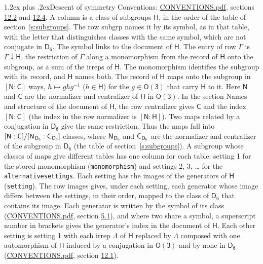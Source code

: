 \documentclass[10pt,a4paper]{article}
\makeatletter
\renewcommand\section{\@startsection{section}{1}{\z@}{-3ex plus -1ex minus -.2ex}%
  {1.2ex plus .2ex}{\normalfont\large\sffamily\bfseries\color{parttitle}}}
\numberwithin{equation}{section}
\newcommand{\grp}[1]{\mathsf{#1}}
\newcommand{\grpindex}[2]{[#1 : #2]}
\newcommand{\restr}[2]{#1\!\downarrow#2}
\newcommand{\hairsp}{\mkern1mu}
\makeatother
\begin{document}
\section{Descent of symmetry}\label{s:subduction}
Conventions: \href{../../CONVENTIONS.pdf}{CONVENTIONS.pdf}, sections \href{../../CONVENTIONS.pdf\#conv.12.2}{12.2} and \href{../../CONVENTIONS.pdf\#conv.12.4}{12.4}.
A column is a class of subgroups $\grp{H}$, in the order of the table of section~\ref{s:subgroups}. The row subgrp names it by its symbol, as in that table, with the letter that distinguishes classes with the same symbol, which are not conjugate in $\grp{D_{6}}$. The symbol links to the document of $\grp{H}$. The entry of row $\Gamma$ is $\restr{\Gamma}{\grp{H}}$, the restriction of $\Gamma$ along a monomorphism from the record of $\grp{H}$ onto the subgroup, as a sum of the irreps of $\grp{H}$. The monomorphism identifies the subgroup with its record, and $\grp{H}$ names both. \label{n:group.normalizer.o3}\label{n:group.centralizer.o3}The record of $\grp{H}$ maps onto the subgroup in $\grpindex{\grp{N}}{\grp{C}}$ ways, $h \mapsto g h g^{-1}$ ($h \in \grp{H}$) for the $g \in \grp{O(3)}$ that carry $\grp{H}$ to it. Here $\grp{N}$ and $\grp{C}$ are the normalizer and centralizer of $\grp{H}$ in \href{O3.pdf}{$\grp{O(3)}$}. In the section Names and structure of the document of $\grp{H}$, the row centralizer gives $\grp{C}$ and the index $\grpindex{\grp{N}}{\grp{C}}$ (the index in the row normalizer is $\grpindex{\grp{N}}{\grp{H}}$). Two maps related by a conjugation in $\grp{D_{6}}$ give the same restriction. Thus the maps fall into $\grpindex{\grp{N}}{\grp{C}}/\grpindex{\grp{N}_{\hairsp \grp{D_{6}}}}{\grp{C}_{\hairsp \grp{D_{6}}}}$ classes, where $\grp{N}_{\hairsp \grp{D_{6}}}$ and $\grp{C}_{\hairsp \grp{D_{6}}}$ are the normalizer and centralizer of the subgroup in $\grp{D_{6}}$ (the table of section~\ref{s:subgroups}). \label{n:head.setting}A subgroup whose classes of maps give different tables has one column for each table: setting 1 for the stored monomorphism (\texttt{monomorphism}) and settings 2, 3, \dots{} for the \texttt{alternativesettings}. Each setting has the images of the generators of $\grp{H}$ (\texttt{setting}). \label{n:head.images}The row images gives, under each setting, each generator whose image differs between the settings, in their order, mapped to the class of $\grp{D_{6}}$ that contains its image. \label{n:element.generator.index}Each generator is written by the symbol of its class (\href{../../CONVENTIONS.pdf}{CONVENTIONS.pdf}, section \href{../../CONVENTIONS.pdf\#conv.5.1}{5.1}), and where two share a symbol, a superscript number in brackets gives the generator's index in the document of $\grp{H}$. \label{n:irrep.Delta}Each other setting is setting 1 with each irrep $\Lambda$ of $\grp{H}$ replaced by $\Lambda$ composed with one automorphism of $\grp{H}$ induced by a conjugation in \href{O3.pdf}{$\grp{O(3)}$} and by none in $\grp{D_{6}}$ (\href{../../CONVENTIONS.pdf}{CONVENTIONS.pdf}, section \href{../../CONVENTIONS.pdf\#conv.12.1}{12.1}).
\end{document}
